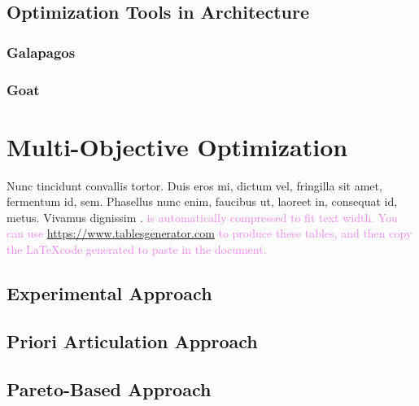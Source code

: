 \subsection{Optimization Tools in Architecture}

\subsubsection{Galapagos}

\subsubsection{Goat}
\section{Multi-Objective Optimization}
Nunc tincidunt convallis tortor. Duis eros mi, dictum vel, fringilla sit amet, fermentum id, sem. Phasellus nunc enim, faucibus ut, laoreet in, consequat id, metus. Vivamus dignissim \cite{Moscoso:2011fk}. \textcolor{violet}{ is automatically compressed to fit text width. You can use \url{https://www.tablesgenerator.com} to produce these tables, and then copy the \LaTeX\space code generated to paste in the document.}

\subsection{Experimental Approach}

\subsection{Priori Articulation Approach}

\subsection{Pareto-Based Approach}

